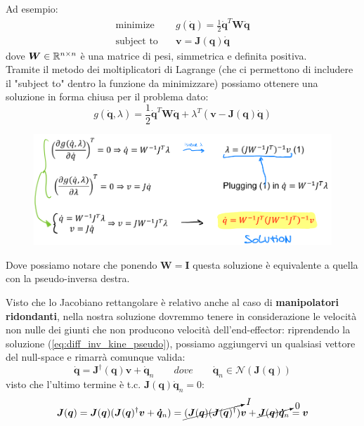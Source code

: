 Ad esempio:
\begin{align*}
\text{minimize} & \quad g(\dot{\bm{q}}) = \frac{1}{2} \dot{\bm{q}}^T \bm{W} \dot{\bm{q}} \\
\text{subject to} & \quad \bm{v} = \bm{J}(\bm{q})\bm{\dot{q}}
\end{align*}
dove $\bm{W}\in\mathbb{R}^{n\times n}$ è una matrice di pesi, simmetrica e definita positiva.\\
Tramite il metodo dei moltiplicatori di Lagrange (che ci permettono di includere il "subject to" dentro la funzione da minimizzare) possiamo ottenere una soluzione in forma chiusa per il problema dato:
$$
g(\dot{\bm{q}}, \lambda) = \frac{1}{2} \dot{\bm{q}}^T \bm{W} \dot{\bm{q}}
+ \lambda^T(\bm{v} - \bm{J}(\bm{q})\dot{\bm{q}})
$$
\begin{figure}[H]
	\centering
	\includegraphics[width=0.7\linewidth]{images/diff_kine_10}
	\label{fig:diffkine10}
\end{figure}

Dove possiamo notare che ponendo $\bm{W} = \bm{I}$ questa soluzione è equivalente a quella con la pseudo-inversa destra.

Visto che lo Jacobiano rettangolare è relativo anche al caso di \textbf{manipolatori ridondanti}, nella nostra soluzione dovremmo tenere in considerazione le velocità non nulle dei giunti che non producono velocità dell'end-effector: riprendendo la soluzione (\ref{eq:diff_inv_kine_pseudo}), possiamo aggiungervi un qualsiasi vettore del null-space e rimarrà comunque valida:
\begin{equation*}
\dot{\bm{q}} = \bm{J}^{\dagger}(\bm{q})\bm{v}
+
\dot{\bm{q}}_n
\qquad
\textit{dove}
\qquad
\dot{\bm{q}}_n \in \mathcal{N}(\bm{J}(\bm{q}))
\tag{$\star$}
\end{equation*}
visto che l'ultimo termine è t.c. $\bm{J}(\bm{q})\dot{\bm{q}}_n = 0$:
$$
\bm{J}(\bm{q})
= 
\bm{J}(\bm{q})(\bm{J}(\bm{q})^{\dagger} \bm{v} + \bm{\dot{q}}_n)
=
\cancelto{I}{(\bm{J}(\bm{q}) (\bm{J}(\bm{q})^\dagger)} \bm{v} + \cancelto{0}{\bm{J}(\bm{q})\bm{\dot{q}}_n} = \bm{v}
$$

